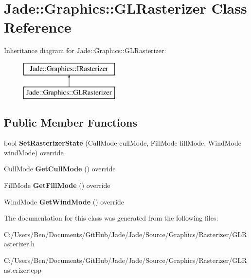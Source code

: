 \hypertarget{class_jade_1_1_graphics_1_1_g_l_rasterizer}{}\section{Jade\+:\+:Graphics\+:\+:G\+L\+Rasterizer Class Reference}
\label{class_jade_1_1_graphics_1_1_g_l_rasterizer}
Inheritance diagram for Jade\+:\+:Graphics\+:\+:G\+L\+Rasterizer\+:\begin{figure}[H]
\begin{center}
\leavevmode
\includegraphics[height=2.000000cm]{class_jade_1_1_graphics_1_1_g_l_rasterizer}
\end{center}
\end{figure}
\subsection*{Public Member Functions}
\begin{DoxyCompactItemize}
\item 
\hypertarget{class_jade_1_1_graphics_1_1_g_l_rasterizer_a69b9b5adae0b32f4fb319b5d1557476e}{}bool {\bfseries Set\+Rasterizer\+State} (Cull\+Mode cull\+Mode, Fill\+Mode fill\+Mode, Wind\+Mode wind\+Mode) override\label{class_jade_1_1_graphics_1_1_g_l_rasterizer_a69b9b5adae0b32f4fb319b5d1557476e}

\item 
\hypertarget{class_jade_1_1_graphics_1_1_g_l_rasterizer_a8aff8db0e1955ca1de3d9bc01ab2e6d3}{}Cull\+Mode {\bfseries Get\+Cull\+Mode} () override\label{class_jade_1_1_graphics_1_1_g_l_rasterizer_a8aff8db0e1955ca1de3d9bc01ab2e6d3}

\item 
\hypertarget{class_jade_1_1_graphics_1_1_g_l_rasterizer_a4e9a2243d277a9222398c65446706a82}{}Fill\+Mode {\bfseries Get\+Fill\+Mode} () override\label{class_jade_1_1_graphics_1_1_g_l_rasterizer_a4e9a2243d277a9222398c65446706a82}

\item 
\hypertarget{class_jade_1_1_graphics_1_1_g_l_rasterizer_ab3b6b605967d04e3ee1b7cbcd8aad608}{}Wind\+Mode {\bfseries Get\+Wind\+Mode} () override\label{class_jade_1_1_graphics_1_1_g_l_rasterizer_ab3b6b605967d04e3ee1b7cbcd8aad608}

\end{DoxyCompactItemize}


The documentation for this class was generated from the following files\+:\begin{DoxyCompactItemize}
\item 
C\+:/\+Users/\+Ben/\+Documents/\+Git\+Hub/\+Jade/\+Jade/\+Source/\+Graphics/\+Rasterizer/G\+L\+Rasterizer.\+h\item 
C\+:/\+Users/\+Ben/\+Documents/\+Git\+Hub/\+Jade/\+Jade/\+Source/\+Graphics/\+Rasterizer/G\+L\+Rasterizer.\+cpp\end{DoxyCompactItemize}

